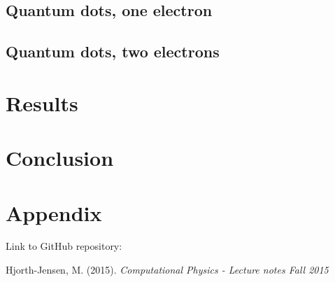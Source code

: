 \documentclass[12pt,a4paper,english]{article}
\begin{document}
\subsection{Quantum dots, one electron}
\label{sect:quantum_one}





\subsection{Quantum dots, two electrons}
\label{sect:quantum_two}
\section{Results}
\section{Conclusion}

\appendix
\section{Appendix}
\label{sect:appendix}
Link to GitHub repository:

\begin{thebibliography}{}
Hjorth-Jensen, M. (2015). \textit{Computational Physics - Lecture notes Fall 2015}
\end{thebibliography}
\end{document}
